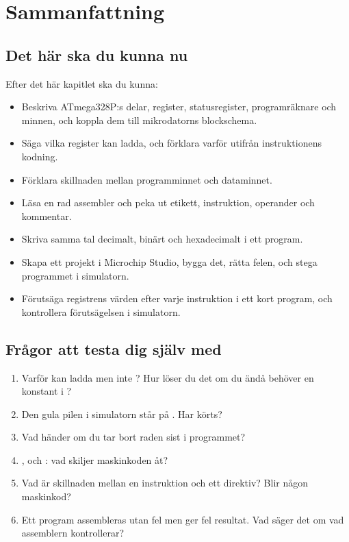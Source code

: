 
\section{Sammanfattning}
\label{c7:sec:summary}

\subsection*{Det här ska du kunna nu}
Efter det här kapitlet ska du kunna:
\begin{itemize}
  \item Beskriva ATmega328P:s delar, register, statusregister, programräknare och minnen, och
    koppla dem till mikrodatorns blockschema.
  \item Säga vilka register  kan ladda, och förklara varför utifrån instruktionens
    kodning.
  \item Förklara skillnaden mellan programminnet och dataminnet.
  \item Läsa en rad assembler och peka ut etikett, instruktion, operander och kommentar.
  \item Skriva samma tal decimalt, binärt och hexadecimalt i ett program.
  \item Skapa ett projekt i Microchip Studio, bygga det, rätta felen, och stega programmet i
    simulatorn.
  \item Förutsäga registrens värden efter varje instruktion i ett kort program, och kontrollera
    förutsägelsen i simulatorn.
\end{itemize}

\subsection*{Frågor att testa dig själv med}
\begin{enumerate}
  \item Varför kan  ladda  men inte ? Hur löser du det om du ändå
    behöver en konstant i ?
  \item Den gula pilen i simulatorn står på . Har  körts?
  \item Vad händer om du tar bort raden  sist i programmet?
  \item {},  och : vad skiljer
    maskinkoden åt?
  \item Vad är skillnaden mellan en instruktion och ett direktiv? Blir 
    någon maskinkod?
  \item Ett program assembleras utan fel men ger fel resultat. Vad säger det om vad assemblern
    kontrollerar?
\end{enumerate}

